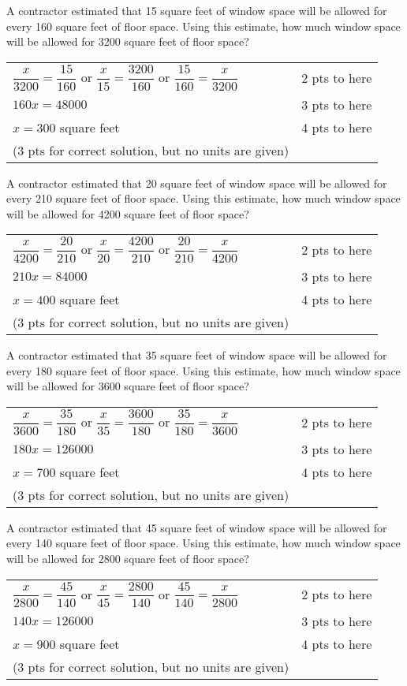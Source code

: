 {
	A contractor estimated that 15 square feet of window space will be allowed for every 160 square feet of floor space.  Using this estimate, how much window space will be allowed for 3200 square feet of floor space?
}
{
\begin{tabular}{l r}
	$\dfrac{x}{3200}=\dfrac{15}{160}$ or
	$\dfrac{x}{15}=\dfrac{3200}{160}$ or
	$\dfrac{15}{160}=\dfrac{x}{3200}$ & 2 pts to here\\
	$160x=48000$  & 3 pts to here \\
	$x=300$ square feet  & 4 pts to here \\
	(3 pts for correct solution, but no units are given)
	\end{tabular}	
}

{
	A contractor estimated that 20 square feet of window space will be allowed for every 210 square feet of floor space.  Using this estimate, how much window space will be allowed for 4200 square feet of floor space?
}
{
\begin{tabular}{l r}
	$\dfrac{x}{4200}=\dfrac{20}{210}$ or
	$\dfrac{x}{20}=\dfrac{4200}{210}$ or
	$\dfrac{20}{210}=\dfrac{x}{4200}$ & 2 pts to here\\
	$210x=84000$ & 3 pts to here\\
	$x=400$ square feet & 4 pts to here \\
	(3 pts for correct solution, but no units are given)
	\end{tabular}	
}

{
	A contractor estimated that 35 square feet of window space will be allowed for every 180 square feet of floor space.  Using this estimate, how much window space will be allowed for 3600 square feet of floor space?
}
{
\begin{tabular}{l r}
	$\dfrac{x}{3600}=\dfrac{35}{180}$ or 
	$\dfrac{x}{35}=\dfrac{3600}{180}$ or
	$\dfrac{35}{180}=\dfrac{x}{3600}$ & 2 pts to here\\
	$180x=126000$ & 3 pts to here\\
	$x=700$ square feet & 4 pts to here \\
	(3 pts for correct solution, but no units are given)
	\end{tabular}		
}

{
	A contractor estimated that 45 square feet of window space will be allowed for every 140 square feet of floor space.  Using this estimate, how much window space will be allowed for 2800 square feet of floor space?
}
{
\begin{tabular}{l r}
	$\dfrac{x}{2800}=\dfrac{45}{140}$ or 
	$\dfrac{x}{45}=\dfrac{2800}{140}$ or 
	$\dfrac{45}{140}=\dfrac{x}{2800}$ & 2 pts to here\\
	$140x=126000$ & 3 pts to here\\
	$x=900$ square feet & 4 pts to here \\
	(3 pts for correct solution, but no units are given)
	\end{tabular}	
}

